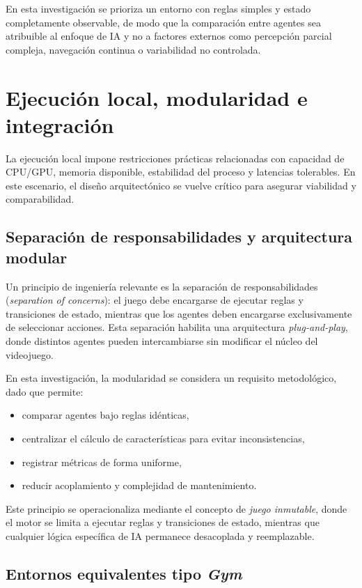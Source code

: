En esta investigación se prioriza un entorno con reglas simples y estado completamente observable, de modo que la comparación entre agentes sea atribuible al enfoque de IA y no a factores externos como percepción parcial compleja, navegación continua o variabilidad no controlada.

\section{Ejecución local, modularidad e integración}

La ejecución local impone restricciones prácticas relacionadas con capacidad de CPU/GPU, memoria disponible, estabilidad del proceso y latencias tolerables. En este escenario, el diseño arquitectónico se vuelve crítico para asegurar viabilidad y comparabilidad.

\subsection{Separación de responsabilidades y arquitectura modular}

Un principio de ingeniería relevante es la separación de responsabilidades (\textit{separation of concerns}): el juego debe encargarse de ejecutar reglas y transiciones de estado, mientras que los agentes deben encargarse exclusivamente de seleccionar acciones. Esta separación habilita una arquitectura \textit{plug-and-play}, donde distintos agentes pueden intercambiarse sin modificar el núcleo del videojuego.

En esta investigación, la modularidad se considera un requisito metodológico, dado que permite:

\begin{itemize}
    \item comparar agentes bajo reglas idénticas,
    \item centralizar el cálculo de características para evitar inconsistencias,
    \item registrar métricas de forma uniforme,
    \item reducir acoplamiento y complejidad de mantenimiento.
\end{itemize}

Este principio se operacionaliza mediante el concepto de \textit{juego inmutable}, donde el motor se limita a ejecutar reglas y transiciones de estado, mientras que cualquier lógica específica de IA permanece desacoplada y reemplazable.

\subsection{Entornos equivalentes tipo \textit{Gym}}

